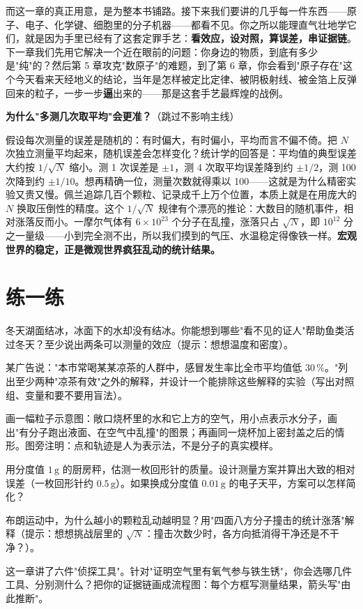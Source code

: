 而这一章的真正用意，是为整本书铺路。接下来我们要讲的几乎每一件东西——原子、电子、化学键、细胞里的分子机器——都看不见。你之所以能理直气壮地学它们，就是因为手里已经有了这套定罪手艺：\textbf{看效应，设对照，算误差，串证据链}。下一章我们先用它解决一个近在眼前的问题：你身边的物质，到底有多少是"纯"的？然后第 5 章攻克"数原子"的难题，到了第 6 章，你会看到"原子存在"这个今天看来天经地义的结论，当年是怎样被定比定律、被阴极射线、被金箔上反弹回来的粒子，一步一步\textbf{逼}出来的——那是这套手艺最辉煌的战例。

\begin{tiaozhan}
\textbf{为什么"多测几次取平均"会更准？}（跳过不影响主线）

假设每次测量的误差是随机的：有时偏大，有时偏小，平均而言不偏不倚。把 $N$ 次独立测量平均起来，随机误差会怎样变化？统计学的回答是：平均值的典型误差大约按 $1/\sqrt{N}$ 缩小。测 1 次误差是 $\pm 1$，测 4 次取平均误差降到约 $\pm 1/2$，测 100 次降到约 $\pm 1/10$。想再精确一位，测量次数就得乘以 100——这就是为什么精密实验又贵又慢。佩兰追踪几百个颗粒、记录成千上万个位置，本质上就是在用庞大的 $N$ 换取压倒性的精度。这个 $1/\sqrt{N}$ 规律有个漂亮的推论：大数目的随机事件，相对涨落反而小。一摩尔气体有 $6\times 10^{23}$ 个分子在乱撞，涨落只占 $\sqrt{N}$，即 $10^{12}$ 分之一量级——小到完全测不出，所以我们摸到的气压、水温稳定得像铁一样。\textbf{宏观世界的稳定，正是微观世界疯狂乱动的统计结果。}
\end{tiaozhan}

\section*{练一练}

\begin{sikaoti}
\item 冬天湖面结冰，冰面下的水却没有结冰。你能想到哪些"看不见的证人"帮助鱼类活过冬天？至少说出两条可以测量的效应（提示：想想温度和密度）。
\item 某广告说："本市常喝某某凉茶的人群中，感冒发生率比全市平均值低 $30\,\%$。"列出至少两种"凉茶有效"之外的解释，并设计一个能排除这些解释的实验（写出对照组、变量和要不要用盲法）。
\item 画一幅粒子示意图：敞口烧杯里的水和它上方的空气，用小点表示水分子，画出"有分子跑出液面、在空气中乱撞"的图景；再画同一烧杯加上密封盖之后的情形。图旁注明：点和轨迹是人为表示法，不是分子的真实模样。
\item 用分度值 $1\,\mathrm{g}$ 的厨房秤，估测一枚回形针的质量。设计测量方案并算出大致的相对误差（一枚回形针约 $0.5\,\mathrm{g}$）。如果换成分度值 $0.01\,\mathrm{g}$ 的电子天平，方案可以怎样简化？
\item 布朗运动中，为什么越小的颗粒乱动越明显？用"四面八方分子撞击的统计涨落"解释（提示：想想挑战层里的 $\sqrt{N}$：撞击次数少时，各方向抵消得干净还是不干净？）。
\item 这一章讲了六件"侦探工具"。针对"证明空气里有氧气参与铁生锈"，你会选哪几件工具、分别测什么？把你的证据链画成流程图：每个方框写测量结果，箭头写"由此推断"。
\end{sikaoti}
